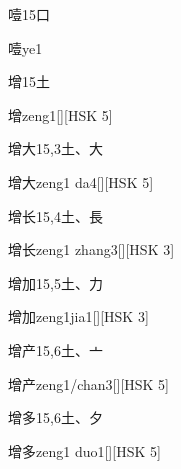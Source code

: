 \begin{Entry}{噎}{15}{⼝}
  \begin{Phonetics}{噎}{ye1}
  \end{Phonetics}
\end{Entry}

\begin{Entry}{增}{15}{⼟}
  \begin{Phonetics}{增}{zeng1}[][HSK 5]
  \end{Phonetics}
\end{Entry}

\begin{Entry}{增大}{15,3}{⼟、⼤}
  \begin{Phonetics}{增大}{zeng1 da4}[][HSK 5]
  \end{Phonetics}
\end{Entry}

\begin{Entry}{增长}{15,4}{⼟、⾧}
  \begin{Phonetics}{增长}{zeng1 zhang3}[][HSK 3]
  \end{Phonetics}
\end{Entry}

\begin{Entry}{增加}{15,5}{⼟、⼒}
  \begin{Phonetics}{增加}{zeng1jia1}[][HSK 3]
  \end{Phonetics}
\end{Entry}

\begin{Entry}{增产}{15,6}{⼟、⼇}
  \begin{Phonetics}{增产}{zeng1/chan3}[][HSK 5]
  \end{Phonetics}
\end{Entry}

\begin{Entry}{增多}{15,6}{⼟、⼣}
  \begin{Phonetics}{增多}{zeng1 duo1}[][HSK 5]
  \end{Phonetics}
\end{Entry}

